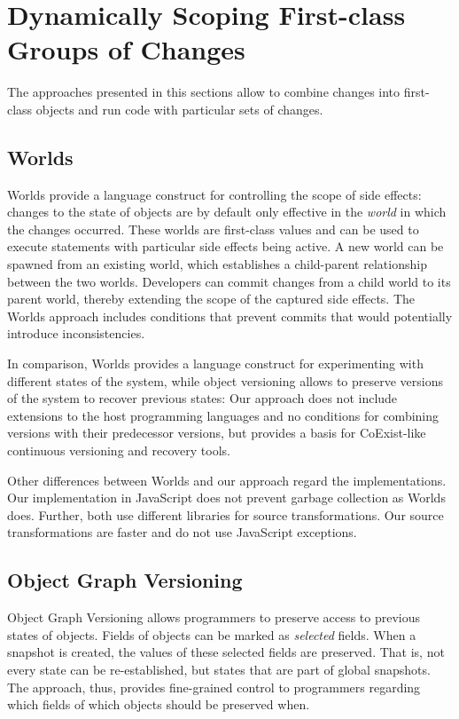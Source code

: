 \section{Dynamically Scoping First-class Groups of Changes}

The approaches presented in this sections allow to combine changes into first-class objects and run code with particular sets of changes.


\subsection{Worlds}

Worlds provide a language construct for controlling the scope of side effects: changes to the state of objects are by default only effective in the \emph{world} in which the changes occurred.
These worlds are first-class values and can be used to execute statements with particular side effects being active.
A new world can be spawned from an existing world, which establishes a child-parent relationship between the two worlds.
Developers can commit changes from a child world to its parent world, thereby extending the scope of the captured side effects.
The Worlds approach includes conditions that prevent commits that would potentially introduce inconsistencies.

In comparison, Worlds provides a language construct for experimenting with different states of the system, while object versioning allows to preserve versions of the system to recover previous states: Our approach does not include extensions to the host programming languages and no conditions for combining versions with their predecessor versions, but provides a basis for CoExist-like continuous versioning and recovery tools.

Other differences between Worlds and our approach regard the implementations.
Our implementation in JavaScript does not prevent garbage collection as Worlds does.
Further, both use different libraries for source transformations.
Our source transformations are faster and do not use JavaScript exceptions.


\subsection{Object Graph Versioning}

Object Graph Versioning\cite{Pluquet2009ECP} allows programmers to preserve access to previous states of objects.
Fields of objects can be marked as \emph{selected} fields.
When a snapshot is created, the values of these selected fields are preserved.
That is, not every state can be re-established, but states that are part of global snapshots. 
The approach, thus, provides fine-grained control to programmers regarding which fields of which objects should be preserved when.

